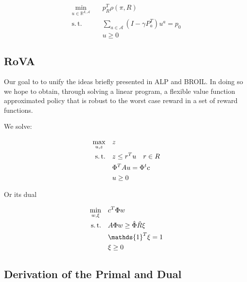 \documentclass{article}
\newcommand{\real}{\mathbb{R}}
\newcommand{\states}{\mathcal{S}}
\newcommand{\actions}{\mathcal{A}}
\begin{document}
\begin{equation}
\begin{aligned}
\min_{u\in \real^{\states, \actions}} \quad &p^T_{R} \rho(\pi, R)\\
\operatorname{s.\,t.}\quad & \sum_{a\in \actions}(I - \gamma P^T_{a})u^a = p_0\\
& u \ge 0
\end{aligned}
\end{equation}

\subsection{RoVA}

Our goal to to unify the ideas briefly presented in ALP and BROIL. In doing so we hope to obtain, through solving a linear program, a flexible value function approximated policy that is robust to the worst case reward in a set of reward functions.

We solve:

\begin{equation}
\begin{aligned}
\max_{u, z}\quad & z\\
\text{s.\,t.} \quad & z \le r^T u \quad r \in R\\
& \Phi^T A u = \Phi^t c\\
& u \ge 0
\end{aligned}
\end{equation}

Or its dual

\begin{equation}
\begin{aligned}
\min_{w, \xi} \quad & c^T\Phi w\\
\text{s.\,t.} \quad & A \Phi w \ge \hat{\Phi}\Tilde{R}\xi\\
& \mathds{1}^T\xi = 1\\
& \xi \ge 0
\end{aligned}
\end{equation}

\subsection{Derivation of the Primal and Dual}


\end{document}
